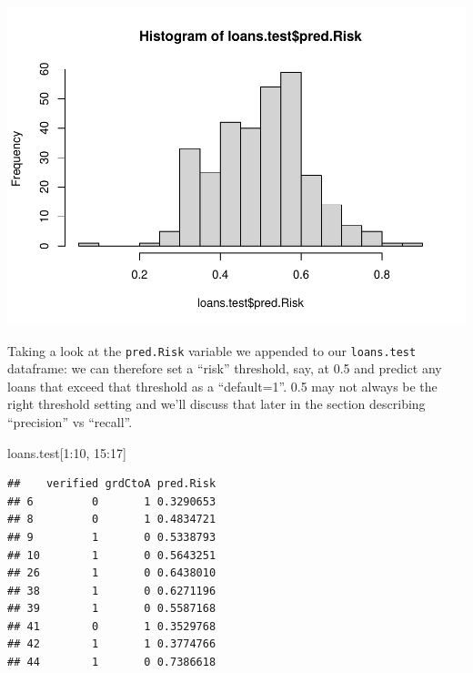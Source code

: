 \documentclass[
]{article}
\newenvironment{Shaded}{\begin{snugshade}}{\end{snugshade}}
\newcommand{\AttributeTok}[1]{\textcolor[rgb]{0.77,0.63,0.00}{#1}}
\newcommand{\DecValTok}[1]{\textcolor[rgb]{0.00,0.00,0.81}{#1}}
\newcommand{\FunctionTok}[1]{\textcolor[rgb]{0.00,0.00,0.00}{#1}}
\newcommand{\NormalTok}[1]{#1}
\newcommand{\SpecialCharTok}[1]{\textcolor[rgb]{0.00,0.00,0.00}{#1}}
\begin{document}
\begin{Shaded}
\end{Shaded}

\includegraphics{classification1_files/figure-latex/unnamed-chunk-43-1.pdf}

Taking a look at the \texttt{pred.Risk} variable we appended to our
\texttt{loans.test} dataframe: we can therefore set a ``risk''
threshold, say, at 0.5 and predict any loans that exceed that threshold
as a ``default=1''. 0.5 may not always be the right threshold setting
and we'll discuss that later in the section describing ``precision'' vs
``recall''.

\begin{Shaded}
\begin{Highlighting}[]
\NormalTok{loans.test[}\DecValTok{1}\SpecialCharTok{:}\DecValTok{10}\NormalTok{, }\DecValTok{15}\SpecialCharTok{:}\DecValTok{17}\NormalTok{]}
\end{Highlighting}
\end{Shaded}

\begin{verbatim}
##    verified grdCtoA pred.Risk
## 6         0       1 0.3290653
## 8         0       1 0.4834721
## 9         1       0 0.5338793
## 10        1       0 0.5643251
## 26        1       0 0.6438010
## 38        1       0 0.6271196
## 39        1       0 0.5587168
## 41        0       1 0.3529768
## 42        1       1 0.3774766
## 44        1       0 0.7386618
\end{verbatim}
\end{document}
